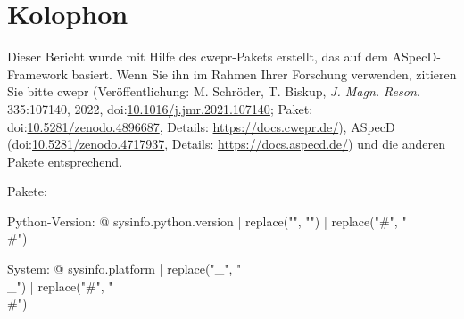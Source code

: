 \section*{Kolophon}

Dieser Bericht wurde mit Hilfe des cwepr-Pakets erstellt, das auf dem ASpecD-Framework basiert. Wenn Sie ihn im Rahmen Ihrer Forschung verwenden, zitieren Sie bitte cwepr (Veröffentlichung: M. Schröder, T. Biskup, \emph{J. Magn. Reson.} 335:107140, 2022, doi:\href{https://doi.org/10.1016/j.jmr.2021.107140}{10.1016/j.jmr.2021.107140}; Paket: doi:\href{https://doi.org/10.5281/zenodo.4896687}{10.5281/zenodo.4896687}, Details: \url{https://docs.cwepr.de/}), ASpecD (doi:\href{https://doi.org/10.5281/zenodo.4717937}{10.5281/zenodo.4717937}, Details: \url{https://docs.aspecd.de/}) und die anderen Pakete entsprechend.

Pakete: %


Python-Version: {@ sysinfo.python.version | replace("\n", "") | replace("#", "\\#") }

System: {@ sysinfo.platform | replace("_", "\\_") | replace("#", "\\#") }
